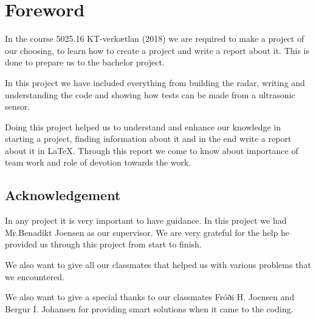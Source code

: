 \chapter{Foreword}
In the course 5025.16 KT-verkætlan (2018) we are required to make a project of our choosing, to learn how to create a project and write a report about it. This is done to prepare us to the bachelor project.

In this project we have included everything from building the radar, writing and understanding the code and showing how tests can be made from a ultrasonic sensor.

Doing this project helped us to understand and enhance our knowledge in starting a project, finding information about it and in the end write a report about it in LaTeX. Through this report we come to know about importance of team work and role of devotion towards the work.

\section*{Acknowledgement} 
In any project it is very important to have guidance. In this project we had Mr.Benadikt Joensen as our supervisor. We are very grateful for the help he provided us through this project from start to finish. 

We also want to give all our classmates that helped us with various problems that we encountered. 

We also want to give a special thanks to our classmates Fróði H. Joensen and Bergur I. Johansen for providing smart solutions when it came to the coding. 